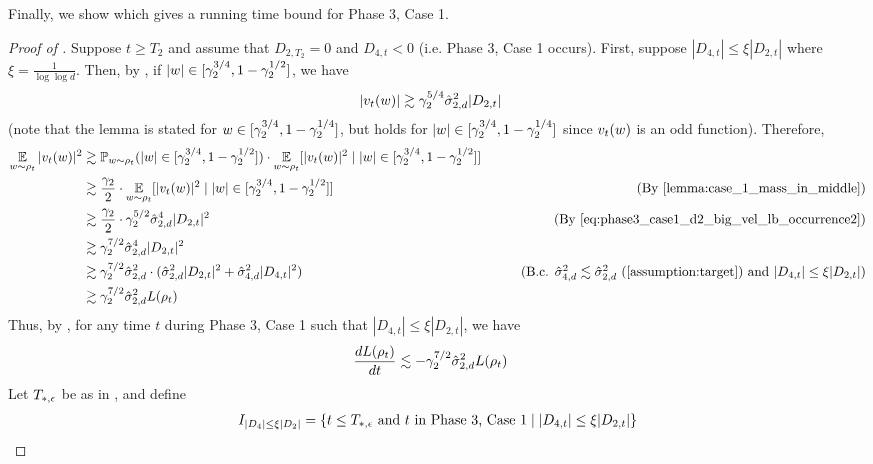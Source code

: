 Finally, we show  which gives a running time bound for Phase 3, Case 1.

\begin{proof}[Proof of ]
Suppose $t \geq T_2$ and assume that $D_{2, T_2} = 0$ and $D_{4, t} < 0$ (i.e. Phase 3, Case 1 occurs). First, suppose $|D_{4, t}| \leq \xi |D_{2, t}|$ where $\xi = \frac{1}{\log \log d}$. Then, by , if $|w| \in [\gamma_2^{3/4}, 1 - \gamma_2^{1/2}]$, we have
\begin{align} \label{eq:phase3_case1_d2_big_vel_lb_occurrence2}
|v_t(w)|
& \gtrsim \gamma_2^{5/4} \hat{\sigma}_{2, d}^2 |D_{2, t}|
\end{align}
(note that the lemma is stated for $w \in [\gamma_2^{3/4}, 1 - \gamma_2^{1/4}]$, but holds for $|w| \in [\gamma_2^{3/4}, 1 - \gamma_2^{1/4}]$ since $v_t(w)$ is an odd function). Therefore,
\begin{align}
\E_{\w \sim \rho_t} |\vel_t(\w)|^2
& \gtrsim \Prob_{\w \sim \rho_t}(|\w| \in [\gamma_2^{3/4}, 1 - \gamma_2^{1/2}]) \cdot \E_{\w \sim \rho_t}[|\vel_t(\w)|^2 \mid |\w| \in [\gamma_2^{3/4}, 1 - \gamma_2^{1/2}]] \\
& \gtrsim \frac{\gamma_2}{2} \cdot \E_{\w \sim \rho_t}[|\vel_t(\w)|^2 \mid |\w| \in [\gamma_2^{3/4}, 1 - \gamma_2^{1/2}]]
& \tag{By \Cref{lemma:case_1_mass_in_middle}} \\
& \gtrsim \frac{\gamma_2}{2} \cdot \gamma_2^{5/2} \sigmaCoeffTwo^4 |D_{2, t}|^2
& \tag{By \Cref{eq:phase3_case1_d2_big_vel_lb_occurrence2}} \\
& \gtrsim \gamma_2^{7/2} \sigmaCoeffTwo^4 |D_{2, t}|^2 \\
& \gtrsim \gamma_2^{7/2} \sigmaCoeffTwo^2 \cdot (\sigmaCoeffTwo^2 |D_{2, t}|^2 + \sigmaCoeffFour^2 |D_{4, t}|^2)
& \tag{B.c. $\sigmaCoeffFour^2 \lesssim \sigmaCoeffTwo^2$ (\Cref{assumption:target}) and $|D_{4, t}| \leq \xi |D_{2, t}|$} \\
& \gtrsim \gamma_2^{7/2} \sigmaCoeffTwo^2 L(\rho_t)
\end{align}
Thus, by , for any time $t$ during Phase 3, Case 1 such that $|D_{4, t}| \leq \xi |D_{2, t}|$, we have
\begin{align} \label{eq:case1_loss_derivative_1}
\frac{dL(\rho_t)}{dt} 
& \lesssim - \gamma_2^{7/2} \hat{\sigma}_{2, d}^2 L(\rho_t)
\end{align}
Let $T_{*, \epsilon}$ be as in , and define
\begin{align}
I_{|D_4| \leq \xi |D_2|} = \{t \leq \Tstar \text{ and }t \text{ in Phase 3, Case 1} \mid |D_{4, t}| \leq \xi |D_{2, t}|\}

\end{align}
\end{proof}
